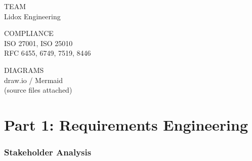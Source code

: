 \documentclass[10pt, a4paper]{article}
\begin{document}
\vspace{0.5cm}
\noindent
\begin{minipage}[t]{0.32\textwidth}{\scriptsize\color{inkFaint}\textsf{TEAM}}\\[2pt]{\small\color{ink}\textsf{Lidox Engineering}}\end{minipage}%
\begin{minipage}[t]{0.32\textwidth}{\scriptsize\color{inkFaint}\textsf{COMPLIANCE}}\\[2pt]{\small\color{ink}\textsf{ISO 27001, ISO 25010}}\\{\small\color{ink}\textsf{RFC 6455, 6749, 7519, 8446}}\end{minipage}%
\begin{minipage}[t]{0.36\textwidth}{\scriptsize\color{inkFaint}\textsf{DIAGRAMS}}\\[2pt]{\small\color{ink}\textsf{draw.io / Mermaid}}\\{\small\color{ink}\textsf{(source files attached)}}\end{minipage}

\newpage\tableofcontents\newpage

\part*{\color{accent}Part 1: Requirements Engineering}

\section{Stakeholder Analysis}
\end{document}
